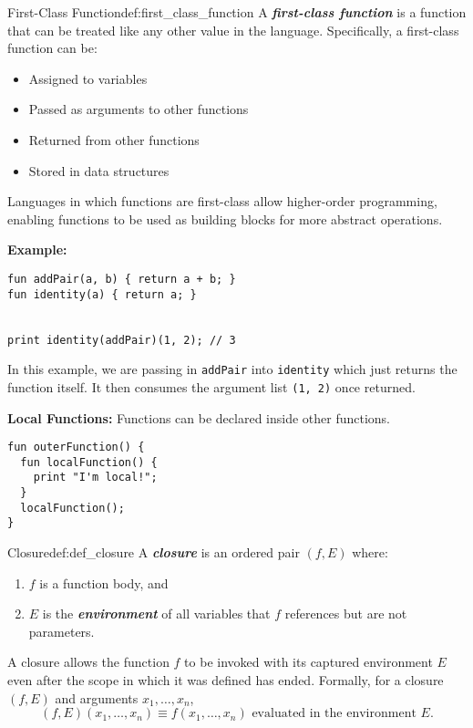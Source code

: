 \documentclass[12pt,a4paper]{article}
\newcommand{\newpar} {
  \vspace{1em}
  \noindent
}
\newcommand{\bemph}[1]{\textbf{\emph{#1}}}
\begin{document}
\begin{definition}{First-Class Function}{def:first_class_function}\label{def:first_class_function}
	A \bemph{first-class function} is a function that can be treated like any other value in the language. Specifically, a first-class function can be:
	\begin{itemize}
		\item Assigned to variables
		\item Passed as arguments to other functions
		\item Returned from other functions
		\item Stored in data structures
	\end{itemize}
	Languages in which functions are first-class allow higher-order programming, enabling functions to be used as building blocks for more abstract operations.
\end{definition}


\newpar
\textbf{Example:}
\begin{lstlisting}
fun addPair(a, b) { return a + b; }
fun identity(a) { return a; }


print identity(addPair)(1, 2); // 3
\end{lstlisting}


\noindent In this example, we are passing in \texttt{addPair} into \texttt{identity} which just
returns the function itself. It then consumes the argument list \texttt{(1, 2)} once returned.

\newpar
\textbf{Local Functions:} Functions can be declared inside other functions.
\begin{lstlisting}
fun outerFunction() {
  fun localFunction() {
    print "I'm local!";
  }
  localFunction();
}
\end{lstlisting} \par

\noindent
\begin{definition}{Closure}{def:def_closure}
	A \bemph{closure} is an ordered pair $(f, E)$ where:
	\begin{enumerate}
		\item $f$ is a function body, and
		\item $E$ is the \bemph{environment} of all variables that $f$ references but are not parameters.
	\end{enumerate}
	A closure allows the function $f$ to be invoked with its captured environment $E$ even after the scope in which it was defined has ended. Formally, for a closure $(f, E)$ and arguments $x_1, \dots, x_n$,
	\[
		(f, E)(x_1, \dots, x_n) \equiv f(x_1, \dots, x_n) \text{ evaluated in the environment } E.
	\]
\end{definition}
\end{document}
